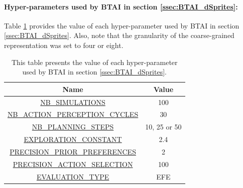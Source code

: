 \documentclass[twoside,11pt]{article}
\begin{document}
\paragraph{Hyper-parameters used by BTAI in section \ref{ssec:BTAI_dSprites}:}

Table \ref{tab:values_hp_BTAI_dSprites} provides the value of each hyper-parameter used by BTAI in section \ref{ssec:BTAI_dSprites}. Also, note that the granularity of the coarse-grained representation was set to four or eight.

\begin{table}[H]
\centering
\begin{tabular}{ |c|c|  }
 \hline
 Name & Value\\
 \hline
 \hline
 \url{NB_SIMULATIONS} & 100\\
 \hline
 \url{NB_ACTION_PERCEPTION_CYCLES} & 30\\
 \hline
 \url{NB_PLANNING_STEPS} & 10, 25 or 50\\
 \hline
 \url{EXPLORATION_CONSTANT} & 2.4\\
 \hline
 \url{PRECISION_PRIOR_PREFERENCES} & 2\\
 \hline
 \url{PRECISION_ACTION_SELECTION} & 100\\
 \hline
 \url{EVALUATION_TYPE} & EFE\\
 \hline
\end{tabular}
\caption{This table presents the value of each hyper-parameter used by BTAI in section \ref{ssec:BTAI_dSprites}.}
\label{tab:values_hp_BTAI_dSprites}
\end{table}

\vskip 0.2in

\end{document}
